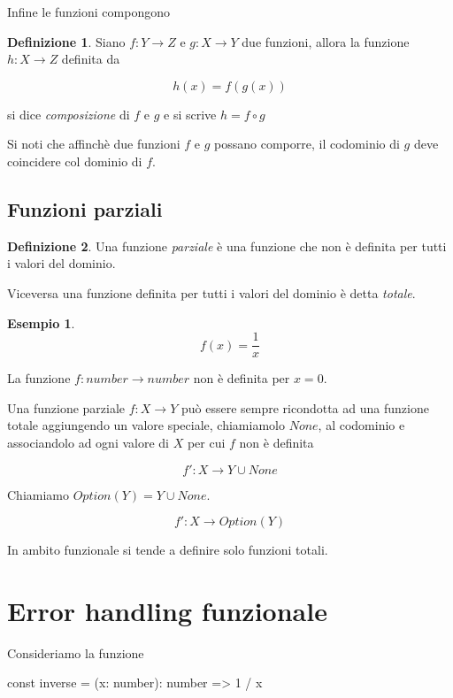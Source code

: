 \documentclass[12pt]{article}
\theoremstyle{definition}
\newtheorem{definition}{Definizione}[section]
\newtheorem{example}{Esempio}[section]
\newenvironment{code}
  {\vspace{0.5cm} \VerbatimEnvironment\begin{typescriptcode}}
  {\end{typescriptcode} \vspace{0.2cm}}
\begin{document}
Infine le funzioni compongono

\begin{definition}
Siano $f: Y \rightarrow Z$ e $g: X \rightarrow Y$ due funzioni, allora la funzione $h: X \rightarrow Z$ definita da

$$
h(x) = f(g(x))
$$

si dice \emph{composizione} di $f$ e $g$ e si scrive $h = f \circ g$

\end{definition}

Si noti che affinchè due funzioni $f$ e $g$ possano comporre, il codominio di $g$ deve coincidere col dominio di $f$.

\subsection{Funzioni parziali}

\begin{definition}
Una funzione \emph{parziale} è una funzione che non è definita per tutti i valori del dominio.
\end{definition}

Viceversa una funzione definita per tutti i valori del dominio è detta \emph{totale}.

\begin{example}
$$
f(x) = \frac{1}{x}
$$
\end{example}

La funzione $f: number \rightarrow number$ non è definita per $x = 0$.

Una funzione parziale $f: X \rightarrow Y$ può essere sempre ricondotta ad una funzione totale aggiungendo un valore speciale,
chiamiamolo $None$, al codominio e associandolo ad ogni valore di $X$ per cui $f$ non è definita

$$
f': X \rightarrow Y \cup None
$$

Chiamiamo $Option(Y) = Y \cup None$.

$$
f': X \rightarrow Option(Y)
$$

In ambito funzionale si tende a definire solo funzioni totali.

\newpage

\section{Error handling funzionale}

Consideriamo la funzione

\begin{code}
const inverse = (x: number): number => 1 / x
\end{code}
\end{document}
